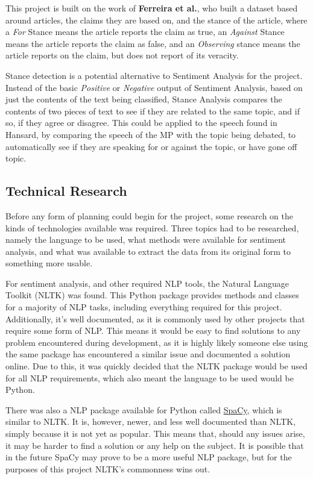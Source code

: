 This project is built on the work of \textbf{Ferreira et al.}\cite{Ferreira2016}, who built a dataset based around articles, the claims they are based on, and the stance of the article, where a \emph{For} Stance means the article reports the claim as true, an \emph{Against} Stance means the article reports the claim as false, and an \emph{Observing} stance means the article reports on the claim, but does not report of its veracity.

Stance detection is a potential alternative to Sentiment Analysis for the project. Instead of the basic \emph{Positive} or \emph{Negative} output of Sentiment Analysis, based on just the contents of the text being classified, Stance Analysis compares the contents of two pieces of text to see if they are related to the same topic, and if so, if they agree or disagree. This could be applied to the speech found in Hansard, by comparing the speech of the MP with the topic being debated, to automatically see if they are speaking for or against the topic, or have gone off topic.

\subsection{Technical Research}
\label{sec:bck_tech_research}

Before any form of planning could begin for the project, some research on the kinds of technologies available was required. Three topics had to be researched, namely the language to be used, what methods were available for sentiment analysis, and what was available to extract the data from its original form to something more usable.

For sentiment analysis, and other required NLP tools, the Natural Language Toolkit (NLTK)\cite{Bird2009} was found. This Python package provides methods and classes for a majority of NLP tasks, including everything required for this project. Additionally, it’s well documented, as it is commonly used by other projects that require some form of NLP. This means it would be easy to find solutions to any problem encountered during development, as it is highly likely someone else using the same package has encountered a similar issue and documented a solution online. Due to this, it was quickly decided that the NLTK package would be used for all NLP requirements, which also meant the language to be used would be Python.

There was also a NLP package available for Python called \href{spacy.io}{SpaCy}, which is similar to NLTK. It is, however, newer, and less well documented than NLTK, simply because it is not yet as popular. This means that, should any issues arise, it may be harder to find a solution or any help on the subject. It is possible that in the future SpaCy may prove to be a more useful NLP package, but for the purposes of this project NLTK's commonness wins out.

